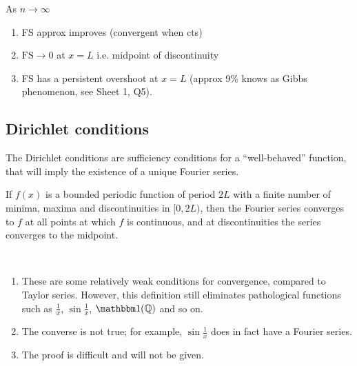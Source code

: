 \begin{note} As $n \to \infty$
    \begin{enumerate}
        \item FS approx improves (convergent when cts)
        \item $\text{FS} \to 0$ at $x = L$ i.e. midpoint of discontinuity
        \item FS has a persistent overshoot at $x = L$ (approx 9\% knows as Gibbs phenomenon, see Sheet 1, Q5).
    \end{enumerate} 
\end{note} 

\subsection{Dirichlet conditions}
The Dirichlet conditions are sufficiency conditions for a ``well-behaved'' function, that will imply the existence of a unique Fourier series.
\begin{theorem}
    If $f(x)$ is a bounded periodic function of period $2L$ with a finite number of minima, maxima and discontinuities in $[0, 2L)$, then the Fourier series converges to $f$ at all points at which $f$ is continuous, and at discontinuities the series converges to the midpoint.
\end{theorem}
\begin{note} \
    \begin{enumerate}
        \item These are some relatively weak conditions for convergence, compared to Taylor series.
            However, this definition still eliminates pathological functions such as $\frac{1}{x}$, $\sin \frac{1}{x}$, $\mathbbm 1 (\mathbb Q)$ and so on.
        \item \color{red}The converse is not true\color{black}; for example, $\sin \frac{1}{x}$ does in fact have a Fourier series.
        \item The proof is difficult and will not be given.
    \end{enumerate}
\end{note}

